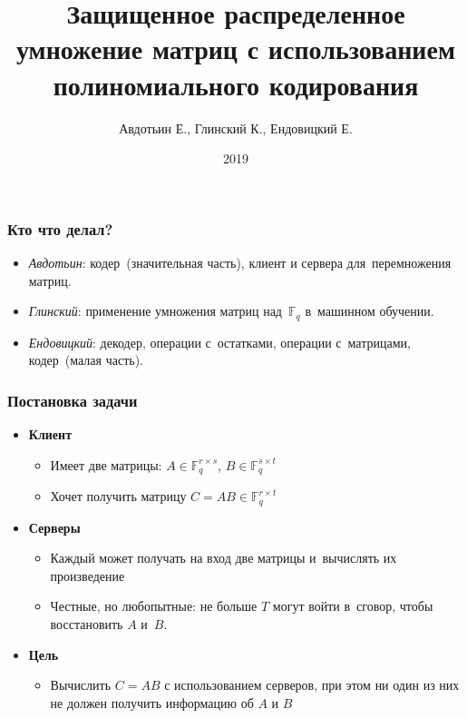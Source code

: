 \documentclass{beamer}
\title{Защищенное распределенное умножение матриц с использованием полиномиального кодирования}
\author{Авдотьин Е., Глинский К., Ендовицкий Е.}
\institute{МФТИ}
\date{2019}
\begin{document}
    
    \frame{\titlepage}
	\begin{frame}
		\frametitle{Кто что делал?}
		\begin{itemize}
			\item \emph{Авдотьин}: кодер~(значительная часть), клиент и сервера для~перемножения матриц.
			\item \emph{Глинский}: применение умножения матриц над~$\mathbb{F}_{q}$ в~машинном обучении.
			\item \emph{Ендовицкий}: декодер, операции с~остатками, операции с~матрицами, кодер~(малая часть).
		\end{itemize}
	\end{frame}

    \begin{frame}
        \frametitle{Постановка задачи}
        \begin{itemize}
            \item<1-> \textbf{Клиент}
            \begin{itemize}
                \item Имеет две матрицы: $A \in \mathbb{F}_q^{r\times s}$, $B \in \mathbb{F}_q^{s\times t}$
                \item Хочет получить матрицу $C = AB \in \mathbb{F}_q^{r \times t}$
            \end{itemize}
            \item<2-> \textbf{Серверы}
            \begin{itemize}
                \item Каждый может получать на вход две матрицы и~вычислять их произведение
		\item Честные, но любопытные: не больше $T$ могут войти в~сговор, чтобы восстановить $A$ и~$B$.
            \end{itemize}
            \item<3-> \textbf{Цель}
            \begin{itemize}
                \item Вычислить $C = AB$ с использованием серверов, при этом ни один из них не должен получить информацию об $A$ и $B$
            \end{itemize}
        \end{itemize}
    \end{frame}
\end{document}
